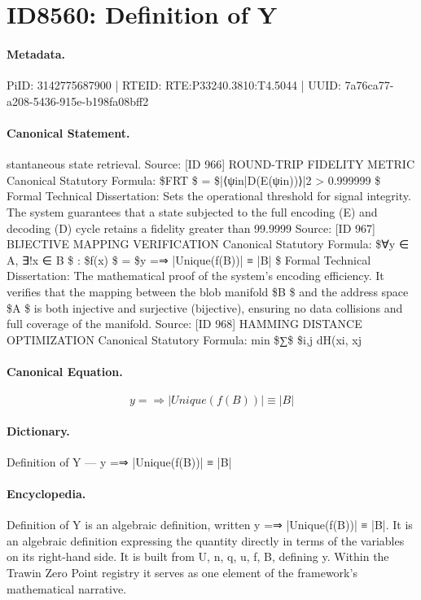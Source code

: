 \section*{ID8560: Definition of Y}
\paragraph{Metadata.}
PiID: 3142775687900 | RTEID: RTE:P33240.3810:T4.5044 | UUID: 7a76ca77-a208-5436-915e-b198fa08bff2

\paragraph{Canonical Statement.}
stantaneous state retrieval. Source: [ID 966] ROUND-TRIP FIDELITY METRIC Canonical Statutory Formula: \$FRT \$ = \$|⟨ψin|D(E(ψin))⟩|2 > 0.999999 \$ Formal Technical Dissertation: Sets the operational threshold for signal integrity. The system guarantees that a state subjected to the full encoding (E) and decoding (D) cycle retains a fidelity greater than 99.9999 Source: [ID 967] BIJECTIVE MAPPING VERIFICATION Canonical Statutory Formula: \$∀y ∈ A, ∃!x ∈ B \$ : \$f(x) \$ = \$y =⇒ |Unique(f(B))| ≡ |B| \$ Formal Technical Dissertation: The mathematical proof of the system’s encoding efficiency. It verifies that the mapping between the blob manifold \$B \$ and the address space \$A \$ is both injective and surjective (bijective), ensuring no data collisions and full coverage of the manifold. Source: [ID 968] HAMMING DISTANCE OPTIMIZATION Canonical Statutory Formula: min \$∑\$ \$i,j dH(xi, xj

\paragraph{Canonical Equation.}
\[
y =⇒ |Unique(f(B))| ≡ |B|
\]

\paragraph{Dictionary.}
Definition of Y — y =⇒ |Unique(f(B))| ≡ |B|

\paragraph{Encyclopedia.}
Definition of Y is an algebraic definition, written y =⇒ |Unique(f(B))| ≡ |B|. It is an algebraic definition expressing the quantity directly in terms of the variables on its right-hand side. It is built from U, n, q, u, f, B, defining y. Within the Trawin Zero Point registry it serves as one element of the framework's mathematical narrative.
